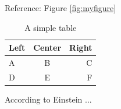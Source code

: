 \documentclass{article}
\begin{document}
Reference: Figure \ref{fig:myfigure}

\begin{table}[h]
  \centering
  \begin{tabular}{|l|c|r|}
    \hline
    Left & Center & Right \\
    \hline
    A & B & C \\
    D & E & F \\
    \hline
  \end{tabular}
  \caption{A simple table}
  \label{tab:mytable}
\end{table}

According to Einstein \cite{einstein1905}...



\end{document}
